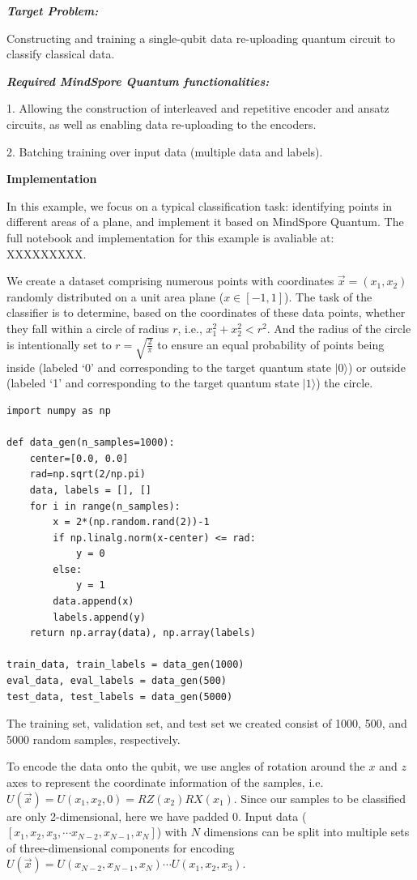 \textbf{\textit{Target Problem:}}

Constructing and training a single-qubit data re-uploading quantum circuit to classify classical data.

\textbf{\textit{Required MindSpore Quantum functionalities:}}

1. Allowing the construction of interleaved and repetitive encoder and ansatz circuits, as well as enabling data re-uploading to the encoders.

2. Batching training over input data (multiple data and labels).

\textbf{Implementation}

In this example, we focus on a typical classification task: identifying points in different areas of a plane, and implement it based on MindSpore Quantum.
The full notebook and implementation for this example is avaliable at: XXXXXXXXX.

We create a dataset comprising numerous points with coordinates $\overrightarrow{x}=(x_1, x_2)$  randomly distributed on a unit area plane ($x\in[-1,1]$). 
The task of the classifier is to determine, based on the coordinates of these data points, whether they fall within a circle of radius $r$, i.e., $x_1^2+x_2^2<r^2$.
And the radius of the circle is intentionally set to $r=\sqrt{\frac{2}{\pi}}$ to ensure an equal probability of points being inside (labeled `0' and corresponding to the target quantum state $|0\rangle$) or outside (labeled `1' and corresponding to the target quantum state $|1\rangle$) the circle.

\begin{lstlisting}
import numpy as np  

def data_gen(n_samples=1000):
    center=[0.0, 0.0]
    rad=np.sqrt(2/np.pi)
    data, labels = [], []
    for i in range(n_samples):
        x = 2*(np.random.rand(2))-1
        if np.linalg.norm(x-center) <= rad:
            y = 0
        else:
            y = 1     
        data.append(x)
        labels.append(y)
    return np.array(data), np.array(labels)
        
train_data, train_labels = data_gen(1000)
eval_data, eval_labels = data_gen(500)
test_data, test_labels = data_gen(5000)
\end{lstlisting}

The training set, validation set, and test set we created consist of 1000, 500, and 5000 random samples, respectively.

To encode the data onto the qubit, we use angles of rotation around the $x$ and $z$ axes to represent the coordinate information of the samples, i.e. $U(\overrightarrow{x})=U(x_1,x_2,0)=RZ(x_2)RX(x_1)$.  Since our samples to be classified are only 2-dimensional, here we have padded 0.
Input data ($[x_1, x_2, x_3, \cdots x_{N-2}, x_{N-1},x_{N}]$) with $N$ dimensions can be split into multiple sets of three-dimensional components for encoding $U(\overrightarrow{x})=U(x_{N-2},x_{N-1},x_{N})\cdots U(x_1,x_2,x_3)$.

